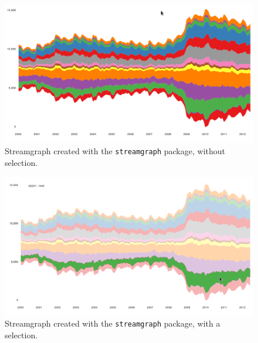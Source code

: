 \begin{figure}[htbp]
\centering
\includegraphics[width=.9\linewidth]{figs/streamgraph_interactive.png}
\caption{Streamgraph created with the \texttt{streamgraph} package, without selection. \label{fig:streamgraph_interactive}}
\end{figure}

\begin{figure}[htbp]
\centering
\includegraphics[width=.9\linewidth]{figs/streamgraph_interactive_selected.png}
\caption{Streamgraph created with the \texttt{streamgraph} package, with a selection. \label{fig:streamgraph_interactive_selected}}
\end{figure}
